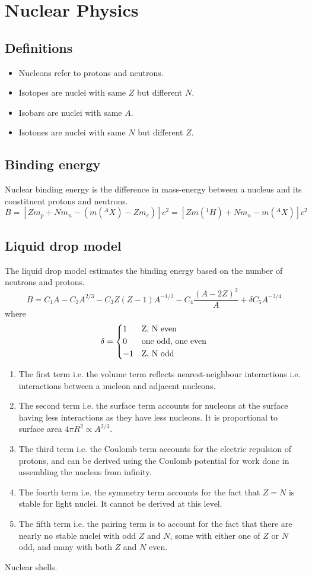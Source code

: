\chapter{Nuclear Physics}
\section{Definitions}
\begin{itemize}
    \item Nucleons refer to protons and neutrons.
    \item Isotopes are nuclei with same \(Z\) but different \(N\).
    \item Isobars are nuclei with same \(A\).
    \item Isotones are nuclei with same \(N\) but different \(Z\).
\end{itemize}
\section{Binding energy}
Nuclear binding energy is the difference in mass-energy between a nucleus and its constituent protons and neutrons. \[B = \left[Zm_p + Nm_n - (m(^AX)-Zm_e)\right]c^2 = \left[Zm(^1H) + Nm_n - m(^AX)\right]c^2\] 
\section{Liquid drop model}
The liquid drop model estimates the binding energy based on the number of neutrons and protons. \[B = C_1A - C_2A^{2/3} - C_3Z(Z-1)A^{-1/3} - C_4\frac{(A-2Z)^2}{A} + \delta C_5A^{-3/4}\] where \[\delta = \begin{dcases}1 &\text{Z, N even}\\0 &\text{one odd, one even}\\-1 &\text{Z, N odd}\end{dcases}\]
\begin{enumerate}
    \item The first term i.e. the volume term reflects nearest-neighbour interactions i.e. interactions between a nucleon and adjacent nucleons.
    \item The second term i.e. the surface term accounts for nucleons at the surface having less interactions as they have less nucleons. It is proportional to surface area \(4\pi R^2 \mathrel\propto A^{2/3}\).
    \item The third term i.e. the Coulomb term accounts for the electric repulsion of protons, and can be derived using the Coulomb potential for work done in assembling the nucleus from infinity.
    \item The fourth term i.e. the symmetry term accounts for the fact that \(Z=N\) is stable for light nuclei. It cannot be derived at this level.
    \item The fifth term i.e. the pairing term is to account for the fact that there are nearly no stable nuclei with odd \(Z\) and \(N\), some with either one of \(Z\) or \(N\) odd, and many with both \(Z\) and \(N\) even.
\end{enumerate}
Nuclear shells.
